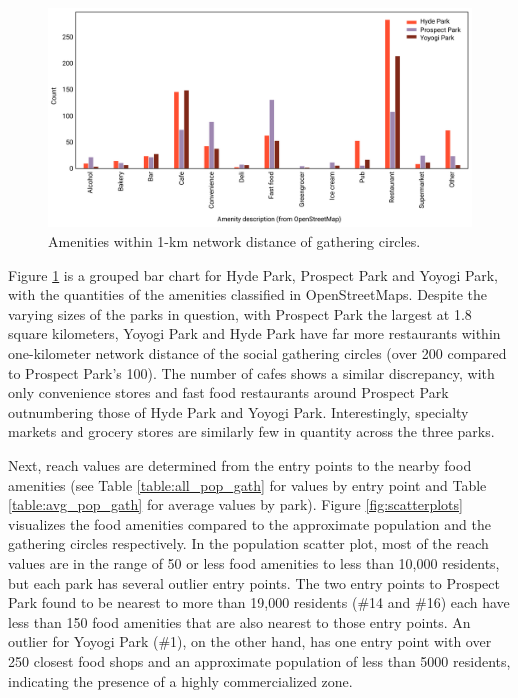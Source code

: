 \begin{figure}[H]
  \centering
  \vspace{8pt}
  \includegraphics[width=1.0\textwidth]{images/network/amenity_bar_chart.png}
  \captionsetup{width=1.0\linewidth}
  \caption[Bar plot]{Amenities within 1-km network distance of gathering circles.}
  \label{fig:amenity_bar_chart}
\end{figure}\par

\begin{multicols}{2}

Figure \ref{fig:amenity_bar_chart} is a grouped bar chart for Hyde Park, Prospect Park and Yoyogi Park, with the quantities of the amenities classified in OpenStreetMaps. Despite the varying sizes of the parks in question, with Prospect Park the largest at 1.8 square kilometers, Yoyogi Park and Hyde Park have far more restaurants within one-kilometer network distance of the social gathering circles (over 200 compared to Prospect Park's 100). The number of cafes shows a similar discrepancy, with only convenience stores and fast food restaurants around Prospect Park outnumbering those of Hyde Park and Yoyogi Park. Interestingly, specialty markets and grocery stores are similarly few in quantity across the three parks.

Next, reach values are determined from the entry points to the nearby food amenities (see Table \ref{table:all_pop_gath} for values by entry point and Table \ref{table:avg_pop_gath} for average values by park). Figure \ref{fig:scatterplots} visualizes the food amenities compared to the approximate population and the gathering circles respectively. In the population scatter plot, most of the reach values are in the range of 50 or less food amenities to less than 10,000 residents, but each park has several outlier entry points. The two entry points to Prospect Park found to be nearest to more than 19,000 residents (\#14 and \#16) each have less than 150 food amenities that are also nearest to those entry points. An outlier for Yoyogi Park (\#1), on the other hand, has one entry point with over 250 closest food shops and an approximate population of less than 5000 residents, indicating the presence of a highly commercialized zone.

\end{multicols}

